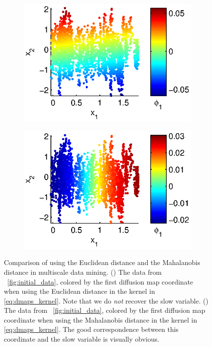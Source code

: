 \begin{figure}[t]
\centering
\begin{subfigure}{0.45\textwidth}
\centering
\includegraphics[width=\textwidth]{data_linear_DMAPS}
\caption{}
\label{subfig:NIV_versus_DMAPS1}
\end{subfigure}
\begin{subfigure}{0.45\textwidth}
\centering
\includegraphics[width=\textwidth]{data_linear_NIV}
\caption{}
\label{subfig:NIV_versus_DMAPS2}
\end{subfigure}
%
\caption[Comparison of using the Euclidean distance and the Mahalanobis distance in analysis of multiscale data]{Comparison of using the Euclidean distance and the Mahalanobis distance in multiscale data mining. () The data from \fig~\ref{fig:initial_data}, colored by the first diffusion map coordinate when using the Euclidean distance in the kernel in \eqref{eq:dmaps_kernel}. Note that we do {\em not} recover the slow variable. () The data from \fig~\ref{fig:initial_data}, colored by the first diffusion map coordinate when using the Mahalanobis distance in the kernel in \eqref{eq:dmaps_kernel}. The good correspondence between this coordinate and the slow variable is visually obvious.}
\label{fig:NIV_versus_DMAPS}
\end{figure}

